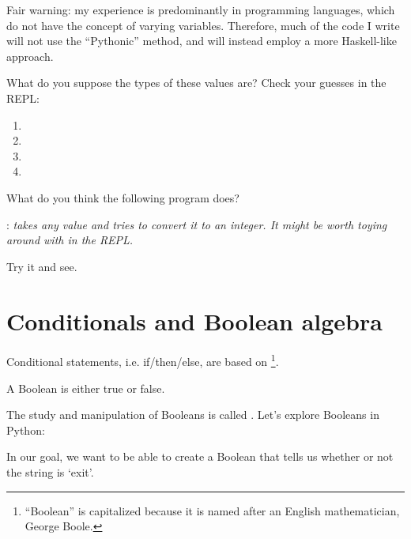 \begin{remark}
  Fair warning: my experience is predominantly in 
  programming languages, which do not have the concept of varying
  variables. Therefore, much of the code I write will not use the
  ``Pythonic'' method, and will instead employ a more Haskell-like
  approach.
\end{remark}

\begin{exercise}
  What do you suppose the types of these values are? Check your
  guesses in the REPL:

  \begin{enumerate}
  \item {}
  \item {}
  \item {}
  \item {}
  \end{enumerate}
\end{exercise}

\begin{exercise}
  What do you think the following program does?


  : \emph{ takes any value and tries to convert
    it to an integer. It might be worth toying around with
     in the REPL.}

  Try it and see.
\end{exercise}

\section{Conditionals and Boolean algebra}

Conditional statements, i.e. if/then/else, are based on
\footnote{``Boolean'' is capitalized because it is
  named after an English mathematician, George Boole.}.

\begin{definition}
  A Boolean is either true or false.
\end{definition}

The study and manipulation of Booleans is called . Let's explore Booleans in Python:


In our goal, we want to be able to create a Boolean that tells us
whether or not the string is `exit'.

